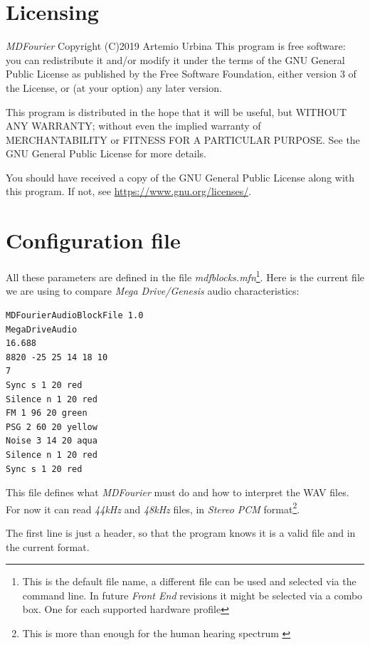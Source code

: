 \documentclass[10pt,a4paper]{report}
\begin{document}
\begin{appendices}
	
\chapter{Licensing}

\textit{MDFourier} Copyright (C)2019 Artemio Urbina
\label{license}
This program is free software: you can redistribute it and/or modify
it under the terms of the GNU General Public License as published by
the Free Software Foundation, either version 3 of the License, or
(at your option) any later version.

This program is distributed in the hope that it will be useful,
but WITHOUT ANY WARRANTY; without even the implied warranty of
MERCHANTABILITY or FITNESS FOR A PARTICULAR PURPOSE.  See the
GNU General Public License for more details.

You should have received a copy of the GNU General Public License
along with this program.  If not, see \url{https://www.gnu.org/licenses/}.	
	
\chapter{Configuration file}
\label{mfnconfig}

All these parameters are defined in the file \textit{mdfblocks.mfn}\footnote{This is the default file name, a different file can be used and selected via the command line. In future \textit{Front End} revisions it might be selected via a combo box. One for each supported hardware profile}. Here is the current file we are using to compare \textit{Mega Drive/Genesis} audio characteristics:

\begin{verbatim}
MDFourierAudioBlockFile 1.0
MegaDriveAudio
16.688
8820 -25 25 14 18 10
7
Sync s 1 20 red
Silence n 1 20 red
FM 1 96 20 green
PSG 2 60 20 yellow
Noise 3 14 20 aqua
Silence n 1 20 red
Sync s 1 20 red
\end{verbatim}

This file defines what \textit{MDFourier} must do and how to interpret the WAV files. For now it can read \textit{44kHz} and \textit{48kHz} files, in \textit{Stereo PCM} format\footnote{This is more than enough for the human hearing spectrum \cite{MontyMontgomery}}.

The first line is just a header, so that the program knows it is a valid file and in the current format.


\end{appendices}
\end{document}
